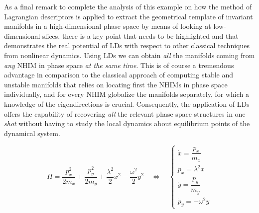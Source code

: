\documentclass[8pt]{article}
\begin{document}
As a final remark to complete the analysis of this example on how the method of Lagrangian descriptors is applied to extract the geometrical template of invariant manifolds in a high-dimensional phase space by means of looking at low-dimensional slices, there is a key point that needs to be highlighted and that demonstrates the real potential of LDs with respect to other classical techniques from nonlinear dynamics. Using LDs we can obtain \textit{all} the manifolds coming from \textit{any} NHIM in phase space \textit{at the same time}. This is of course a tremendous advantage in comparison to the classical approach of computing stable and unstable manifolds that relies on locating first the NHIMs in phase space individually, and for every NHIM globalize the manifolds separately, for which a knowledge of the eigendirections is crucial. Consequently, the application of LDs offers the capability of recovering \textit{all} the relevant phase space structures in one \textit{shot} without having to study the local dynamics about equilibrium points of the dynamical system.

\bigskip
\bigskip

\begin{equation}
H = \dfrac{p_x^2}{2m_x} + \dfrac{p_y^2}{2m_y} + \dfrac{\lambda^2}{2} x^2 - \dfrac{\omega^2}{2} y^2 \quad \Leftrightarrow \quad
\begin{cases}
\dot{x} = \dfrac{p_x}{m_x} \\[.3cm]
\dot{p}_{x} = \lambda^2 x \\[.3cm]
\dot{y} = \dfrac{p_y}{m_y} \\[.3cm]
\dot{p}_{y} = -\omega^2 y 
\end{cases}
\label{index1_Ham}
\end{equation}

\bigskip
\bigskip
\bigskip
\bigskip
\end{document}
